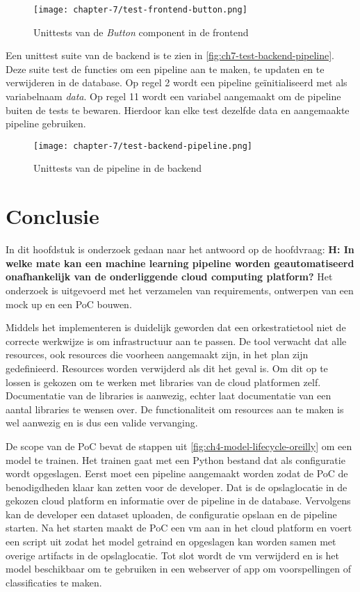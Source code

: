 \begin{figure}[hbt!]
  \centering
  \texttt{[image: chapter-7/test-frontend-button.png]}
  \caption{Unittests van de \textit{Button} component in de frontend}
  \label{fig:ch7-test-frontend-button}
\end{figure}

Een unittest suite van de backend is te zien in \autoref{fig:ch7-test-backend-pipeline}. Deze suite test de functies om een pipeline aan te maken, te updaten en te verwijderen in de database. Op regel 2 wordt een pipeline geïnitialiseerd met als variabelnaam \textit{data}. Op regel 11 wordt een variabel aangemaakt om de pipeline buiten de tests te bewaren. Hierdoor kan elke test dezelfde data en aangemaakte pipeline gebruiken.

\newpage

\begin{figure}[hbt!]
  \centering
  \texttt{[image: chapter-7/test-backend-pipeline.png]}
  \caption{Unittests van de pipeline in de backend}
  \label{fig:ch7-test-backend-pipeline}
\end{figure}


\section{Conclusie}\label{sec:ch7-conclusie}
In dit hoofdstuk is onderzoek gedaan naar het antwoord op de hoofdvraag: \textbf{H: In welke mate kan een machine learning pipeline worden geautomatiseerd onafhankelijk van de onderliggende cloud computing platform?} Het onderzoek is uitgevoerd met het verzamelen van requirements, ontwerpen van een mock up en een PoC bouwen.

Middels het implementeren is duidelijk geworden dat een orkestratietool niet de correcte werkwijze is om infrastructuur aan te passen. De tool verwacht dat alle resources, ook resources die voorheen aangemaakt zijn, in het plan zijn gedefinieerd. Resources worden verwijderd als dit het geval is. Om dit op te lossen is gekozen om te werken met libraries van de cloud platformen zelf. Documentatie van de libraries is aanwezig, echter laat documentatie van een aantal libraries te wensen over. De functionaliteit om resources aan te maken is wel aanwezig en is dus een valide vervanging.

De scope van de PoC bevat de stappen uit \autoref{fig:ch4-model-lifecycle-oreilly} om een model te trainen. Het trainen gaat met een Python bestand dat als configuratie wordt opgeslagen. Eerst moet een pipeline aangemaakt worden zodat de PoC de benodigdheden klaar kan zetten voor de developer. Dat is de opslaglocatie in de gekozen cloud platform en informatie over de pipeline in de database. Vervolgens kan de developer een dataset uploaden, de configuratie opslaan en de pipeline starten. Na het starten maakt de PoC een \acrshort{vm} aan in het cloud platform en voert een script uit zodat het model getraind en opgeslagen kan worden samen met overige \glspl{artifact} in de opslaglocatie. Tot slot wordt de \acrshort{vm} verwijderd en is het model beschikbaar om te gebruiken in een webserver of app om voorspellingen of classificaties te maken.

